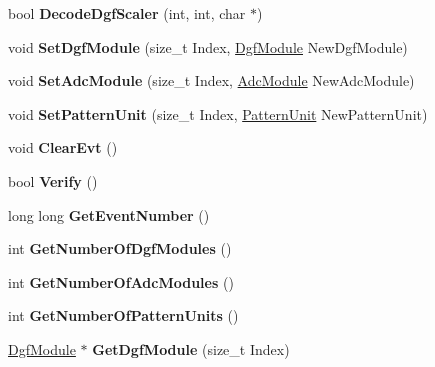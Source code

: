 \begin{DoxyCompactItemize}
bool {\bfseries Decode\+Dgf\+Scaler} (int, int, char $\ast$)
\item 
\mbox{\label{class_unpacked_event_a8a2410a51de9fdfa467866b4d041cd51}} 
void {\bfseries Set\+Dgf\+Module} (size\+\_\+t Index, \hyperlink{class_dgf_module}{Dgf\+Module} New\+Dgf\+Module)
\item 
\mbox{\label{class_unpacked_event_ad0cf4ae46cfc609594ca67b55a98c2fc}} 
void {\bfseries Set\+Adc\+Module} (size\+\_\+t Index, \hyperlink{class_adc_module}{Adc\+Module} New\+Adc\+Module)
\item 
\mbox{\label{class_unpacked_event_a44f6c5ae5cc6e6103be86a776730b603}} 
void {\bfseries Set\+Pattern\+Unit} (size\+\_\+t Index, \hyperlink{class_pattern_unit}{Pattern\+Unit} New\+Pattern\+Unit)
\item 
\mbox{\label{class_unpacked_event_a664861c77ddac5439a82b376982a82d4}} 
void {\bfseries Clear\+Evt} ()
\item 
\mbox{\label{class_unpacked_event_a99fe4883b6afaeeb7323942dc4c2df35}} 
bool {\bfseries Verify} ()
\item 
\mbox{\label{class_unpacked_event_ad041cb52b49e07a5abd74956f25d8d6e}} 
long long {\bfseries Get\+Event\+Number} ()
\item 
\mbox{\label{class_unpacked_event_a8411c29339ab3d12ead8dc040f5eb124}} 
int {\bfseries Get\+Number\+Of\+Dgf\+Modules} ()
\item 
\mbox{\label{class_unpacked_event_a17961a5669eeee7f7d8e864d7d59e031}} 
int {\bfseries Get\+Number\+Of\+Adc\+Modules} ()
\item 
\mbox{\label{class_unpacked_event_a6513a1facbdd44bc401e3ddb1d4c7e0e}} 
int {\bfseries Get\+Number\+Of\+Pattern\+Units} ()
\item 
\mbox{\label{class_unpacked_event_a3dc0fa2fb893c935047e3fe28e7a0ab3}} 
\hyperlink{class_dgf_module}{Dgf\+Module} $\ast$ {\bfseries Get\+Dgf\+Module} (size\+\_\+t Index)

\end{DoxyCompactItemize}
